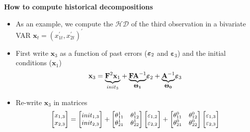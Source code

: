 \documentclass[10pt,handout]{beamer}
\begin{document}
\vspace{0.1cm}

\begin{frame}
{\textbf{How to compute historical decompositions }}

\begin{itemize}
\item As an example, we compute the $\mathcal{HD}$ of the third observation
in a bivariate VAR $\mathbf{x}_{t}=\left( x_{1t}^{\prime },x_{2t}^{\prime
}\right) ^{\prime }$\medskip \pause

\item First write $\mathbf{x}_{3}$ as a function of past errors ($\mathbf{%
\varepsilon }_{2}$ and $\mathbf{\varepsilon }_{3}$) and the initial
conditions ($\mathbf{x}_{1}$)%
\begin{equation*}
\mathbf{x}_{3}=\underset{init_{3}}{\underbrace{\mathbf{F}^{2}\mathbf{x}_{1}}}%
+\underset{\boldsymbol{\Theta }_{\boldsymbol{1}}}{\underbrace{\mathbf{FA}%
^{-1}}}\mathbf{\varepsilon }_{2}+\underset{\boldsymbol{\Theta }_{\boldsymbol{%
0}}}{\underbrace{\mathbf{A}^{-1}}}\mathbf{\varepsilon }_{3}
\end{equation*}%
\pause

\item Re-write $\mathbf{x}_{3}$ in matrices%
\begin{equation*}
{\small 
\begin{bmatrix}
x_{1,3} \\ 
x_{2,3}%
\end{bmatrix}%
=%
\begin{bmatrix}
init_{1,3} \\ 
init_{2,3}%
\end{bmatrix}%
+%
\begin{bmatrix}
\theta _{11}^{1} & \theta _{12}^{1} \\ 
\theta _{21}^{1} & \theta _{22}^{1}%
\end{bmatrix}%
\begin{bmatrix}
\varepsilon _{1,2} \\ 
\varepsilon _{2,2}%
\end{bmatrix}%
+%
\begin{bmatrix}
\theta _{11}^{0} & \theta _{12}^{0} \\ 
\theta _{21}^{0} & \theta _{22}^{0}%
\end{bmatrix}%
\begin{bmatrix}
\varepsilon _{1,3} \\ 
\varepsilon _{2,3}%
\end{bmatrix}%
}
\end{equation*}
\end{itemize}
\end{frame}
\end{document}
